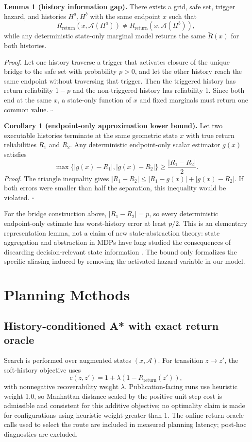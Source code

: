\documentclass[conference]{IEEEtran}
\newcommand{\Rret}{R_{\mathrm{return}}}
\newcommand{\Aset}{\mathcal{A}}
\begin{document}
\textbf{Lemma 1 (history information gap).}
There exists a grid, safe set, trigger hazard, and histories $H^a,H^b$ with the same endpoint $x$ such that
\begin{equation}
\Rret(x,\Aset(H^a))\neq\Rret(x,\Aset(H^b)),
\end{equation}
while any deterministic state-only marginal model returns the same $\widetilde R(x)$ for both histories.

\emph{Proof.} Let one history traverse a trigger that activates closure of the unique bridge to the safe set with probability $p>0$, and let the other history reach the same endpoint without traversing that trigger. Then the triggered history has return reliability $1-p$ and the non-triggered history has reliability $1$. Since both end at the same $x$, a state-only function of $x$ and fixed marginals must return one common value. \hfill$\square$

\textbf{Corollary 1 (endpoint-only approximation lower bound).}
Let two executable histories terminate at the same geometric state $x$ with true return reliabilities $R_1$ and $R_2$. Any deterministic endpoint-only scalar estimator $g(x)$ satisfies
\begin{equation}
\max\{|g(x)-R_1|,|g(x)-R_2|\}\geq \frac{|R_1-R_2|}{2}.
\label{eq:alias-lower-bound}
\end{equation}
\emph{Proof.} The triangle inequality gives $|R_1-R_2|\leq |R_1-g(x)|+|g(x)-R_2|$. If both errors were smaller than half the separation, this inequality would be violated. \hfill$\square$

For the bridge construction above, $|R_1-R_2|=p$, so every deterministic endpoint-only estimate has worst-history error at least $p/2$. This is an elementary representation lemma, not a claim of new state-abstraction theory: state aggregation and abstraction in MDPs have long studied the consequences of discarding decision-relevant state information \cite{li2006stateabstraction}. The bound only formalizes the specific aliasing induced by removing the activated-hazard variable in our model.

\section{Planning Methods}
\subsection{History-conditioned A* with exact return oracle}
Search is performed over augmented states $(x,\Aset)$. For transition $z\rightarrow z'$, the soft-history objective uses
\begin{equation}
c(z,z')=1+\lambda\left(1-\Rret(z')\right),
\label{eq:cost}
\end{equation}
with nonnegative recoverability weight $\lambda$. Publication-facing runs use heuristic weight 1.0, so Manhattan distance scaled by the positive unit step cost is admissible and consistent for this additive objective; no optimality claim is made for configurations using heuristic weight greater than 1. The online return-oracle calls used to select the route are included in measured planning latency; post-hoc diagnostics are excluded.
\end{document}
